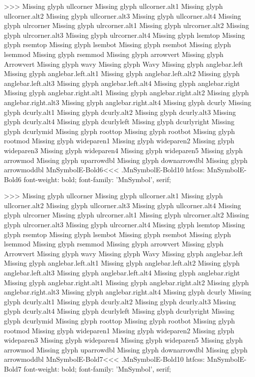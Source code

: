 >>>
Missing glyph	ullcorner
Missing glyph	ullcorner.alt1
Missing glyph	ullcorner.alt2
Missing glyph	ullcorner.alt3
Missing glyph	ullcorner.alt4
Missing glyph	ulrcorner
Missing glyph	ulrcorner.alt1
Missing glyph	ulrcorner.alt2
Missing glyph	ulrcorner.alt3
Missing glyph	ulrcorner.alt4
Missing glyph	lsemtop
Missing glyph	rsemtop
Missing glyph	lsembot
Missing glyph	rsembot
Missing glyph	lsemmod
Missing glyph	rsemmod
Missing glyph	arrowvert
Missing glyph	Arrowvert
Missing glyph	wavy
Missing glyph	Wavy
Missing glyph	anglebar.left
Missing glyph	anglebar.left.alt1
Missing glyph	anglebar.left.alt2
Missing glyph	anglebar.left.alt3
Missing glyph	anglebar.left.alt4
Missing glyph	anglebar.right
Missing glyph	anglebar.right.alt1
Missing glyph	anglebar.right.alt2
Missing glyph	anglebar.right.alt3
Missing glyph	anglebar.right.alt4
Missing glyph	dcurly
Missing glyph	dcurly.alt1
Missing glyph	dcurly.alt2
Missing glyph	dcurly.alt3
Missing glyph	dcurly.alt4
Missing glyph	dcurlyleft
Missing glyph	dcurlyright
Missing glyph	dcurlymid
Missing glyph	roottop
Missing glyph	rootbot
Missing glyph	rootmod
Missing glyph	wideparen1
Missing glyph	wideparen2
Missing glyph	wideparen3
Missing glyph	wideparen4
Missing glyph	wideparen5
Missing glyph	arrowmod
Missing glyph	uparrowdbl
Missing glyph	downarrowdbl
Missing glyph	arrowmoddbl
\<MnSymbolE-Bold6\><<<
.MnSymbolE-Bold10
htfcss:  MnSymbolE-Bold6  font-weight: bold; font-family: 'MnSymbol', serif;

>>>
Missing glyph	ullcorner
Missing glyph	ullcorner.alt1
Missing glyph	ullcorner.alt2
Missing glyph	ullcorner.alt3
Missing glyph	ullcorner.alt4
Missing glyph	ulrcorner
Missing glyph	ulrcorner.alt1
Missing glyph	ulrcorner.alt2
Missing glyph	ulrcorner.alt3
Missing glyph	ulrcorner.alt4
Missing glyph	lsemtop
Missing glyph	rsemtop
Missing glyph	lsembot
Missing glyph	rsembot
Missing glyph	lsemmod
Missing glyph	rsemmod
Missing glyph	arrowvert
Missing glyph	Arrowvert
Missing glyph	wavy
Missing glyph	Wavy
Missing glyph	anglebar.left
Missing glyph	anglebar.left.alt1
Missing glyph	anglebar.left.alt2
Missing glyph	anglebar.left.alt3
Missing glyph	anglebar.left.alt4
Missing glyph	anglebar.right
Missing glyph	anglebar.right.alt1
Missing glyph	anglebar.right.alt2
Missing glyph	anglebar.right.alt3
Missing glyph	anglebar.right.alt4
Missing glyph	dcurly
Missing glyph	dcurly.alt1
Missing glyph	dcurly.alt2
Missing glyph	dcurly.alt3
Missing glyph	dcurly.alt4
Missing glyph	dcurlyleft
Missing glyph	dcurlyright
Missing glyph	dcurlymid
Missing glyph	roottop
Missing glyph	rootbot
Missing glyph	rootmod
Missing glyph	wideparen1
Missing glyph	wideparen2
Missing glyph	wideparen3
Missing glyph	wideparen4
Missing glyph	wideparen5
Missing glyph	arrowmod
Missing glyph	uparrowdbl
Missing glyph	downarrowdbl
Missing glyph	arrowmoddbl
\<MnSymbolE-Bold7\><<<
.MnSymbolE-Bold10
htfcss:  MnSymbolE-Bold7  font-weight: bold; font-family: 'MnSymbol', serif;

